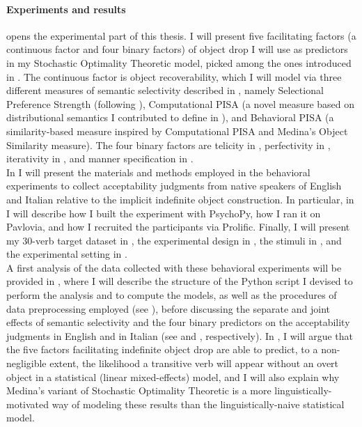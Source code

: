 \paragraph{Experiments and results}
 opens the experimental part of this thesis. I will present five facilitating factors (a continuous factor and four binary factors) of object drop I will use as predictors in my Stochastic Optimality Theoretic model, picked among the ones introduced in . The continuous factor is object recoverability, which I will model via three different measures of semantic selectivity described in , namely  Selectional Preference Strength (following \textcite{Medina2007}), Computational PISA (a novel measure based on distributional semantics I contributed to define in \textcite{CappelliLenciPISA}), and Behavioral PISA (a similarity-based measure inspired by Computational PISA and Medina's Object Similarity measure). The four binary factors are telicity in , perfectivity in , iterativity in , and manner specification in .\\
In  I will present the materials and methods employed in the behavioral experiments to collect acceptability judgments from native speakers of English and Italian relative to the implicit indefinite object construction. In particular, in  I will describe how I built the experiment with PsychoPy, how I ran it on Pavlovia, and how I recruited the participants via Prolific. Finally, I will present my 30-verb target dataset in , the experimental design in , the stimuli in , and the experimental setting in .\\
A first analysis of the data collected with these behavioral experiments will be provided in , where I will describe the structure of the Python script I devised to perform the analysis and to compute the models, as well as the procedures of data preprocessing employed (see ), before discussing the separate and joint effects of semantic selectivity and the four binary predictors on the acceptability judgments in English and in Italian (see  and , respectively). In , I will argue that the five factors facilitating indefinite object drop are able to predict, to a non-negligible extent, the likelihood a transitive verb will appear without an overt object in a statistical (linear mixed-effects) model, and I will also explain why Medina's variant of Stochastic Optimality Theoretic is a more linguistically-motivated way of modeling these results than the linguistically-naive statistical model.\\
